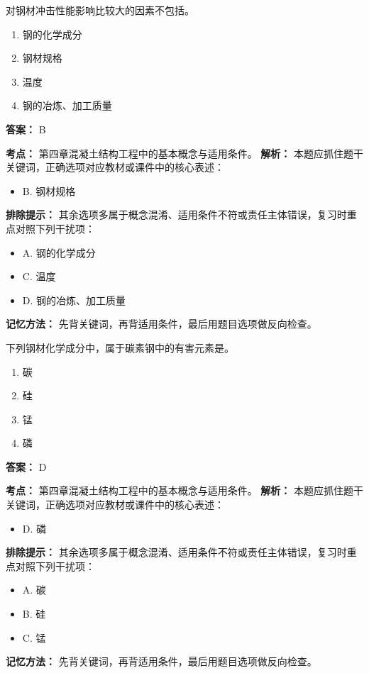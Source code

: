 \documentclass[UTF8,fontset=fandol,11pt]{ctexart}
\begin{document}
\vspace{0.2em}

\begin{quizbox}[title={第 9 题}]
对钢材冲击性能影响比较大的因素不包括。\\
\begin{enumerate}[label=\Alph*.]
\item 钢的化学成分
\item 钢材规格
\item 温度
\item 钢的冶炼、加工质量
\end{enumerate}
\textbf{答案：} B
\vspace{0.25em}
\begin{answerbox}[title={考点解析}]
\textbf{考点：} 第四章混凝土结构工程中的基本概念与适用条件。
\textbf{解析：} 本题应抓住题干关键词，正确选项对应教材或课件中的核心表述：
\begin{itemize}
\item B. 钢材规格
\end{itemize}
\textbf{排除提示：} 其余选项多属于概念混淆、适用条件不符或责任主体错误，复习时重点对照下列干扰项：
\begin{itemize}
\item A. 钢的化学成分
\item C. 温度
\item D. 钢的冶炼、加工质量
\end{itemize}
\textbf{记忆方法：} 先背关键词，再背适用条件，最后用题目选项做反向检查。
\end{answerbox}
\end{quizbox}

\vspace{0.2em}

\begin{quizbox}[title={第 10 题}]
下列钢材化学成分中，属于碳素钢中的有害元素是。\\
\begin{enumerate}[label=\Alph*.]
\item 碳
\item 硅
\item 锰
\item 磷
\end{enumerate}
\textbf{答案：} D
\vspace{0.25em}
\begin{answerbox}[title={考点解析}]
\textbf{考点：} 第四章混凝土结构工程中的基本概念与适用条件。
\textbf{解析：} 本题应抓住题干关键词，正确选项对应教材或课件中的核心表述：
\begin{itemize}
\item D. 磷
\end{itemize}
\textbf{排除提示：} 其余选项多属于概念混淆、适用条件不符或责任主体错误，复习时重点对照下列干扰项：
\begin{itemize}
\item A. 碳
\item B. 硅
\item C. 锰
\end{itemize}
\textbf{记忆方法：} 先背关键词，再背适用条件，最后用题目选项做反向检查。
\end{answerbox}
\end{quizbox}
\end{document}
